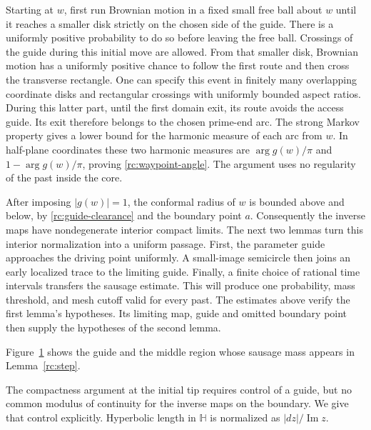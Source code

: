 Starting at $w$, first run Brownian motion in a fixed small free ball
about $w$ until it reaches a smaller disk strictly on the chosen side of
the guide.  There is a uniformly positive probability to do so before
leaving the free ball.  Crossings of the guide during this initial move
are allowed.  From that smaller disk, Brownian motion has a uniformly
positive chance to follow the first route and then cross the transverse
rectangle.  One can specify this event in finitely many overlapping
coordinate disks and rectangular crossings with uniformly bounded aspect
ratios.  During this latter part, until the first domain exit, its route
avoids the access guide.  Its exit therefore belongs to the chosen
prime-end arc.  The strong Markov property gives a lower bound for the harmonic
measure of each arc from $w$.  In half-plane coordinates these two
harmonic measures are $\arg g(w)/\pi$ and $1-\arg g(w)/\pi$, proving
\eqref{rc:waypoint-angle}.  The argument uses no regularity of the past
inside the core.

After imposing $|g(w)|=1$, the conformal radius of $w$ is bounded above
and below, by \eqref{rc:guide-clearance} and the boundary point $a$.
Consequently the inverse maps have nondegenerate interior compact
limits.  The next two lemmas turn this interior normalization into a uniform
passage. First, the parameter guide approaches the driving point
uniformly. A small-image semicircle then joins an early localized trace
to the limiting guide. Finally, a finite choice of rational time
intervals transfers the sausage estimate. This will produce one
probability, mass threshold, and mesh cutoff valid for every past.
The estimates above verify the first lemma's hypotheses. Its limiting
map, guide and omitted boundary point then supply the hypotheses of
the second lemma.


\begin{figure}[tbp]
\centering

\caption{\RibbonFrontCaption}
\label{fig:ribbon-front}
\end{figure}

Figure~\ref{fig:ribbon-front} shows the guide and the middle region
whose sausage mass appears in Lemma~\ref{rc:step}.


The compactness argument at the initial tip requires control of a guide,
but no common modulus of continuity for the inverse maps on the boundary.
We give that control explicitly.  Hyperbolic length in
$\mathbb H$ is normalized as $|dz|/\operatorname{Im}z$.

